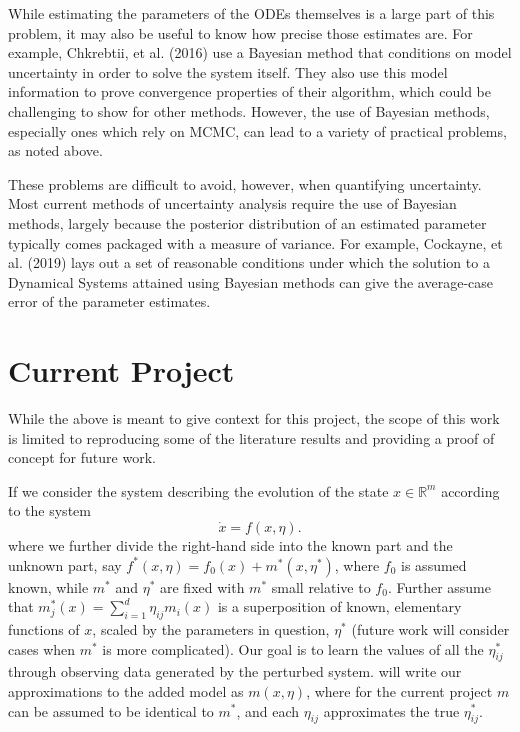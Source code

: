 \documentclass[12pt]{article}
\begin{document}
While estimating the parameters of the ODEs themselves is a large part of this problem, it may also be useful to know how precise those estimates are. For example, Chkrebtii, et al. (2016) use a Bayesian method that conditions on model uncertainty in order to solve the system itself. They also use this model information to prove convergence properties of their algorithm, which could be challenging to show for other methods.\cite{chkrebtii} However, the use of Bayesian methods, especially ones which rely on MCMC, can lead to a variety of practical problems, as noted above.

These problems are difficult to avoid, however, when quantifying uncertainty. Most current methods of uncertainty analysis require the use of Bayesian methods, largely because the posterior distribution of an estimated parameter typically comes packaged with a measure of variance. For example, Cockayne, et al. (2019) lays out a set of reasonable conditions under which the solution to a Dynamical Systems attained using Bayesian methods can give the average-case error of the parameter estimates.\cite{cockayne}


\section{Current Project}



While the above is meant to give context for this project, the scope of this work is limited to reproducing some of the literature results and providing a proof of concept for future work.

If we consider the system describing the evolution of the state $x \in \mathbb{R}^m$ according to the system $$\dot{x} = f(x,\eta).$$ where we further divide the right-hand side into the known part and the unknown part, say $f^*(x, \eta) = f_0(x) + m^*(x, \eta^*)$, where $f_0$ is assumed known, while $m^*$ and $\eta^*$ are fixed with $m^*$ small relative to $f_0$. Further assume that $m_j^*(x) = \sum_{i=1}^d \eta_{ij} m_i(x)$ is a superposition of known, elementary functions of $x$, scaled by the parameters in question, $\eta^*$ (future work will consider cases when $m^*$ is more complicated). Our goal is to learn the values of all the $\eta^*_{ij}$ through observing data generated by the perturbed system.  will write our approximations to the added model as $m(x,\eta)$, where for the current project $m$ can be assumed to be identical to $m^*$, and each $\eta_{ij}$ approximates the true $\eta^*_{ij}$.
\end{document}
